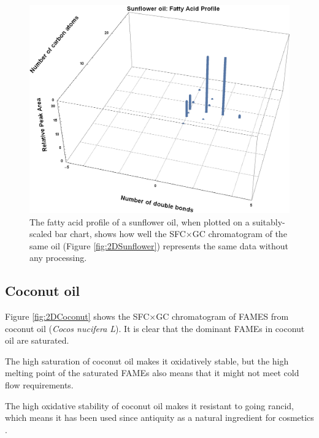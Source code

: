 \begin{figure}
\centering
\includegraphics[width=\textwidth]{Figures/BarChart.png}
\decoRule

\caption[3D Bar chart of fatty acid profile]{The fatty acid profile of a
sunflower oil, when plotted on a suitably-scaled bar chart, shows how well the
SFC×GC chromatogram of the same oil (Figure \ref{fig:2DSunflower}) represents
the same data without any processing.}

\label{fig:2DSunflowerBarChart}
\end{figure}

\subsection{Coconut oil}

Figure \ref{fig:2DCoconut} shows the SFC×GC chromatogram of FAMES from coconut
oil (\textit{Cocos nucifera L}). It is clear that the dominant FAMEs in coconut
oil are saturated.

The high saturation of coconut oil makes it oxidatively stable, but the high
melting point of the saturated FAMEs also means that it might not meet
cold flow requirements.

The high oxidative stability of coconut oil makes it resistant to going rancid,
which means it has been used since antiquity as a natural ingredient for cosmetics
\autocite{Berdick1972}.

